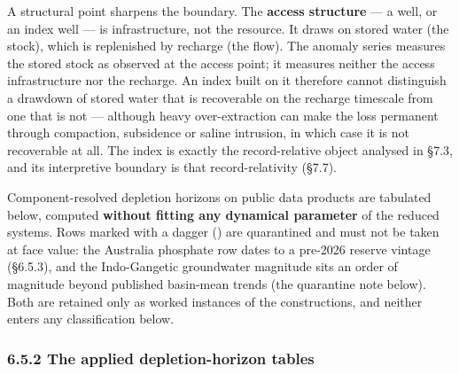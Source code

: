 \documentclass[11pt]{article}
\begin{document}
A structural point sharpens the boundary. The \textbf{access structure} --- a well, or an index well --- is infrastructure, not the resource. It draws on stored water (the stock), which is replenished by recharge (the flow). The anomaly series measures the stored stock as observed at the access point; it measures neither the access infrastructure nor the recharge. An index built on it therefore cannot distinguish a drawdown of stored water that is recoverable on the recharge timescale from one that is not --- although heavy over-extraction can make the loss permanent through compaction, subsidence or saline intrusion, in which case it is not recoverable at all. The index is exactly the record-relative object analysed in \S7.3, and its interpretive boundary is that record-relativity (\S7.7).

Component-resolved depletion horizons on public data products are tabulated below, computed \textbf{without fitting any dynamical parameter} of the reduced systems. Rows marked with a dagger (\dag{}) are quarantined and must not be taken at face value: the Australia phosphate row dates to a pre-2026 reserve vintage (\S6.5.3), and the Indo-Gangetic groundwater magnitude sits an order of magnitude beyond published basin-mean trends (the quarantine note below). Both are retained only as worked instances of the constructions, and neither enters any classification below.

\subsubsection*{6.5.2 The applied depletion-horizon tables}\label{652-the-applied-depletion-horizon-tables}
\end{document}
